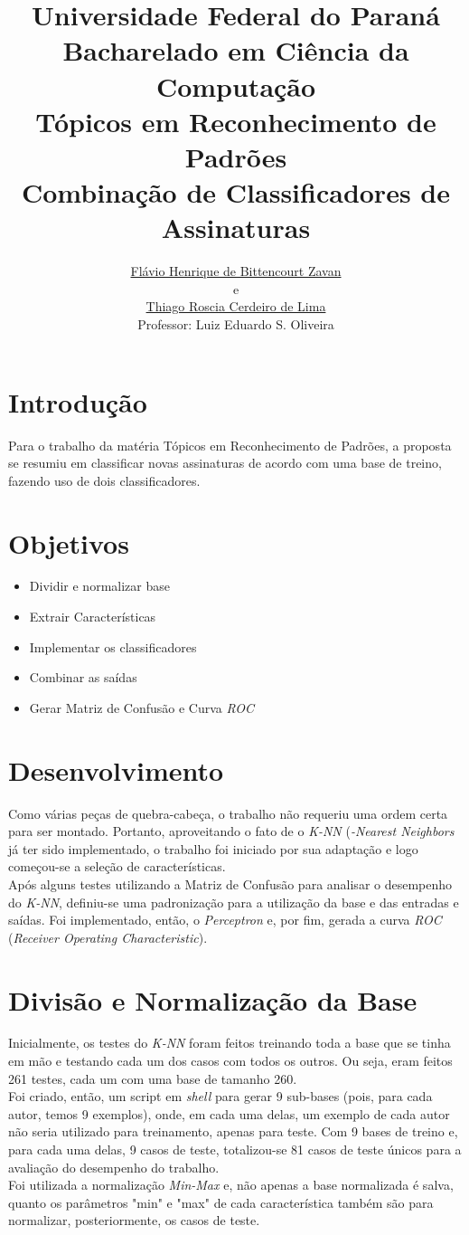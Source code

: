 \documentclass[a4paper,12pt]{article}
\title{Universidade Federal do Paraná \\
    Bacharelado em Ciência da Computação \\
    Tópicos em Reconhecimento de Padrões \\
    \textbf{Combinação de Classificadores de Assinaturas}}
\author{\href{mailto:fhbz10@inf.ufpr.br}{Flávio Henrique de Bittencourt Zavan}\\ e \\
    \href{mailto:trcl10@inf.ufpr.br}{Thiago Roscia Cerdeiro de Lima} \\
    Professor: Luiz Eduardo S. Oliveira}
\begin{document}
\maketitle

\section*{Introdução}
Para o trabalho da matéria Tópicos em Reconhecimento de Padrões, a proposta se
resumiu em classificar novas assinaturas de acordo com uma base de treino,
fazendo uso de dois classificadores. 

\section*{Objetivos}
\begin{itemize}
    \item Dividir e normalizar base
    \item Extrair Características
    \item Implementar os classificadores
    \item Combinar as saídas
    \item Gerar Matriz de Confusão e Curva \textit{ROC}
\end{itemize}

\section{Desenvolvimento}
Como várias peças de quebra-cabeça, o trabalho não requeriu uma ordem certa
para ser montado. Portanto, aproveitando o fato de o \textit{K-NN} (\textit{-Nearest Neighbors}
 já ter sido implementado, o trabalho foi iniciado por sua adaptação e
logo começou-se a seleção de características.\\
Após alguns testes utilizando a Matriz de Confusão para analisar
o desempenho do \textit{K-NN}, definiu-se uma padronização para a utilização da base e das
 entradas e saídas. Foi implementado, então, o \textit{Perceptron} e, por fim, gerada a
 curva \textit{ROC} (\textit{Receiver Operating Characteristic}).

\section{Divisão e Normalização da Base}
Inicialmente, os testes do \textit{K-NN} foram feitos treinando toda a base que
se tinha em mão e testando cada um dos casos com todos os outros. Ou seja,
eram feitos 261 testes, cada um com uma base de tamanho 260.\\
Foi criado, então, um script em \textit{shell} para gerar 9 sub-bases (pois, para cada
autor, temos 9 exemplos), onde, em cada uma delas, um exemplo de cada autor 
não seria utilizado para treinamento, apenas para teste. Com 9 bases de treino
e, para cada uma delas, 9 casos de teste, totalizou-se 81 casos de teste únicos
para a avaliação do desempenho do trabalho.\\
Foi utilizada a normalização \textit{Min-Max} e, não apenas a base normalizada é 
salva, quanto os parâmetros "min" e "max" de cada característica também são para
 normalizar, posteriormente, os casos de teste.
\end{document}
